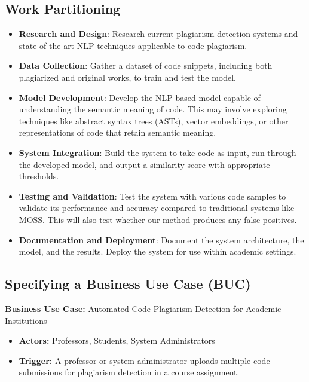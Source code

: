 \documentclass[12pt]{article}
\begin{document}
\subsection{Work Partitioning}
\begin{itemize}
  \item \textbf{Research and Design}: Research current plagiarism detection systems and state-of-the-art NLP techniques applicable to code plagiarism.
  
  \item \textbf{Data Collection}: Gather a dataset of code snippets, including both plagiarized and original works, to train and test the model.
  
  \item \textbf{Model Development}: Develop the NLP-based model capable of understanding the semantic meaning of code. This may involve exploring techniques like abstract syntax trees (ASTs), vector embeddings, or other representations of code that retain semantic meaning.
  
  \item \textbf{System Integration}: Build the system to take code as input, run through the developed model, and output a similarity score with appropriate thresholds.
  
  \item \textbf{Testing and Validation}: Test the system with various code samples to validate its performance and accuracy compared to traditional systems like MOSS. This will also test whether our method produces any false positives.
  
  \item \textbf{Documentation and Deployment}: Document the system architecture, the model, and the results. Deploy the system for use within academic settings.
\end{itemize}
\subsection{Specifying a Business Use Case (BUC)}

\textbf{Business Use Case:} Automated Code Plagiarism Detection for Academic Institutions

\begin{itemize}
    \item \textbf{Actors:} Professors, Students, System Administrators
    \item \textbf{Trigger:} A professor or system administrator uploads multiple code submissions for plagiarism detection in a course assignment.
\end{itemize}
\end{document}
